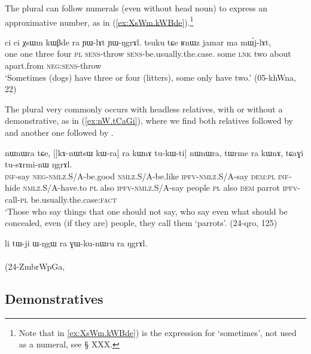 The plural can follow numerals (even without head noun) to express an approximative number, as in (\ref{ex:XsWm.kWBde}).\footnote{Note that in \ref{ex:XsWm.kWBde})  is the expression for `sometimes', not used as a numeral, see § XXX.}

\begin{exe}
\ex \label{ex:XsWm.kWBde}
\gll ci ci χsɯm kɯβde ra ɲɯ-lɤt ɲɯ-ŋgrɤl. tsuku tɕe ʁnɯz jamar ma mɯ́j-lɤt,\\
one one three four \textsc{pl} \textsc{sens}-throw \textsc{sens}-be.usually.the.case. some \textsc{lnk} two about apart.from \textsc{neg}:\textsc{sens}-throw \\
\glt  `Sometimes (dogs) have three or four (litters), some only have two.' (05-khWna, 22)
\end{exe} 


The plural  very commonly occurs with headless relatives, with or without a demonstrative, as in (\ref{ex:nW.tCaGi}), where we find both relatives followed by  and another one followed by .

\begin{exe}
\ex \label{ex:nW.tCaGi}
\gll [kɤ-ti mɤ-kɯ-pe kɯ-fse tu-kɯ-ti] nɯnɯra tɕe, [[kɤ-nɯtsɯ kɯ-ra] ra kɯnɤ tu-kɯ-ti] nɯnɯra, 
tɯrme ra kɯnɤ, tɕaɣi tu-sɤrmi-nɯ ŋgrɤl.  \\
\textsc{inf}-say \textsc{neg}-\textsc{nmlz}.S/A-be.good \textsc{nmlz}.S/A-be.like \textsc{ipfv}-\textsc{nmlz}.S/A-say \textsc{dem}:\textsc{pl} \textsc{inf}-hide \textsc{nmlz}.S/A-have.to \textsc{pl} also \textsc{ipfv}-\textsc{nmlz}.S/A-say people \textsc{pl} also \textsc{dem} parrot \textsc{ipfv}-call-\textsc{pl} be.usually.the.case:\textsc{fact} \\
\glt `Those who say things that one should not say, who say even what should be concealed, even (if they are) people, they call them `parrots'. (24-qro, 125)
\end{exe} 

 

\begin{exe}
\ex \label{ex:GWkWnWru.ra}
 \gll li tɯ-ji ɯ-ŋgɯ ra ɣɯ-ku-nɯru ra ŋgrɤl. \\
 \\
(24-ZmbrWpGa, 
\end{exe}
\subsection{Demonstratives} \label{sec:demonstrative.determiners}

